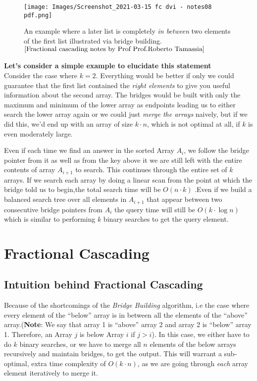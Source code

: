 \documentclass[11pt]{article}
\begin{document}
\begin{figure}[H]
    \centering
    \texttt{[image: Images/Screenshot\_2021-03-15 fc dvi - notes08 pdf.png]}
    \caption{An example where a later list is completely \textit{in between} two elements of the first list illustrated via bridge building.$^{\cite{Fractional cascading notes by Prof Prof.Roberto Tamassia}}$}
    \label{fig:label}
\end{figure}


\textbf{Let's consider a simple example to elucidate this statement} \\
Consider the case where $k = 2$. Everything would be better if only we could guarantee that the first list contained the \textit{right elements} to give you useful information about the second array. The bridges would be built with only the maximum and minimum of the lower array as endpoints leading us to either search the lower array again or we could just \textit{merge the arrays} naively, but if we did this, we'd end up with an array of size $k \cdot n$, which is not optimal at all, if $k$ is even moderately large.

Even if each time we find an answer in the sorted Array $A_i$, we follow the bridge pointer from it as well as from the key above it we are still left with the entire contents of array $A_{i+1}$ to search. This continues through the entire set of $k$ arrays. If we search each array by doing a linear scan from the point at which the bridge told us to begin,the total search time will be $O(n \cdot k)$ .Even if we build a balanced search tree over all elements in $A_{i+1}$ that appear between two consecutive bridge pointers from $A_i$ the query time will still be $O(k \cdot \log n)$ which is similar to performing $k$ binary searches to get the query element.



\section{Fractional Cascading}

\subsection{Intuition behind Fractional Cascading}
Because of the shortcomings of the \textit{Bridge Building} algorithm, i.e the case where every element of the ``below'' array is in between all the elements of the ``above'' array.(\textbf{Note}: We say that array 1 is “above” array 2 and array 2 is “below” array 1. Therefore, an Array $j$ is below Array $i$ if $j > i$). In this case, we either have to do $k$ binary searches, or we have to merge all $n$ elements of the below arrays recursively and maintain bridges, to get the output. This will warrant a sub-optimal, extra time complexity of $O(k \cdot n)$, as we are going through \textit{each} array element iteratively to merge it.
\end{document}
